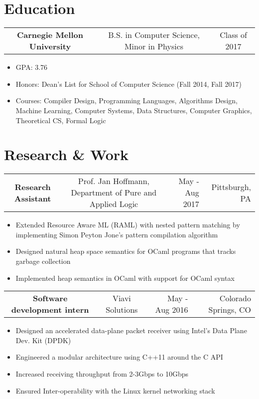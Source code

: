 \documentclass[12pt]{article}
\begin{document}
\section{Education}

\begin{tabular}{>{\bfseries}c | c | c}
Carnegie Mellon University & B.S. in Computer Science, Minor in Physics & Class of 2017
\end{tabular}

\begin{itemize}
\item GPA: 3.76
\item Honors: Dean's List for School of Computer Science (Fall 2014, Fall 2017)
\item Courses: Compiler Design, Programming Languages, Algorithms Design, Machine Learning, Computer Systems, Data Structures, Computer Graphics, Theoretical CS, Formal Logic
\end{itemize}

\section{Research \& Work}
\begin{tabular}{>{\bfseries}c | c | r | r}
Research Assistant & Prof. Jan Hoffmann, Department of Pure and Applied Logic & May - Aug 2017 & Pittsburgh, PA
\end{tabular}

\begin{itemize}
\item Extended Resource Aware ML (RAML) with nested pattern matching by implementing Simon Peyton Jone's pattern compilation algorithm
\item Designed natural heap space semantics for OCaml programs that tracks garbage collection
\item Implemented heap semantics in OCaml with support for OCaml syntax
\end{itemize}

\begin{tabular}{>{\bfseries}c | c | r | r}
Software development intern & Viavi Solutions & May - Aug 2016 & Colorado Springs, CO
\end{tabular}

\begin{itemize}
\item Designed an accelerated data-plane packet receiver using Intel's Data Plane Dev. Kit (DPDK) 
\item Engineered a modular architecture using C++11 around the C API
\item Increased receiving throughput from 2-3Gbps to 10Gbps
\item Ensured Inter-operability with the Linux kernel networking stack
\end{itemize}
\end{document}
